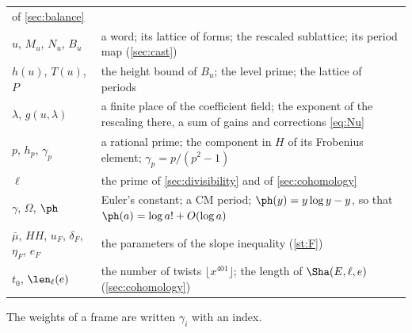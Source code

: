 \begin{center}
\begin{tabular}{@{}p{}p{}@{}}
  of \cref{sec:balance}\\
$u$, $M_u$, $N_u$, $B_u$ & a word; its lattice of forms; the rescaled sublattice; its period
  map (\cref{sec:cast})\\
$h(u)$, $T(u)$, $P$ & the height bound of $B_u$; the level prime; the lattice of periods\\
$\lambda$, $g(u,\lambda)$ & a finite place of the coefficient field; the exponent of the
  rescaling there, a sum of gains and corrections \eqref{eq:Nu}\\
$p$, $h_p$, $\gamma_p$ & a rational prime; the component in $H$ of its Frobenius element;
  $\gamma_p=p/(p^2-1)$\\
$\ell$ & the prime of \cref{sec:divisibility} and of \cref{sec:cohomology}\\
$\gamma$, $\Omega$, $\ph$ & Euler's constant; a CM period; $\ph(y)=y\log y-y$, so that
  $\ph(a)=\log a!+O(\log a)$\\
$\bar\mu$, $HH$, $u_F$, $\delta_F$, $\eta_F$, $e_F$ & the parameters of the slope inequality
  (\cref{st:F})\\
$t_0$, $\len_\ell(e)$ & the number of twists $\lfloor x^{401}\rfloor$; the length of
  $\Sha(E,\ell,e)$ (\cref{sec:cohomology})\\
\bottomrule
\end{tabular}
\end{center}
The weights of a frame are written $\gamma_i$ with an index.
